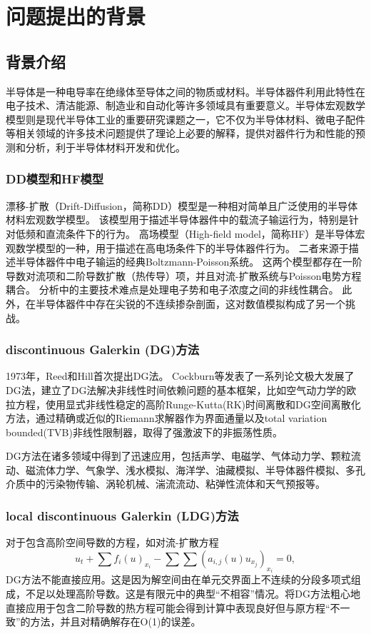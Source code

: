 \section{问题提出的背景}

\subsection{背景介绍}
半导体是一种电导率在绝缘体至导体之间的物质或材料。半导体器件利用此特性在电子技术、清洁能源、制造业和自动化等许多领域具有重要意义。半导体宏观数学模型则是现代半导体工业的重要研究课题之一，它不仅为半导体材料、微电子配件等相关领域的许多技术问题提供了理论上必要的解释，提供对器件行为和性能的预测和分析，利于半导体材料开发和优化。
\subsubsection{DD模型\cite{cercignani2000device}和HF模型\cite{cercignani2000device}}
漂移-扩散（Drift-Diffusion，简称DD）模型是一种相对简单且广泛使用的半导体材料宏观数学模型。
该模型用于描述半导体器件中的载流子输运行为，特别是针对低频和直流条件下的行为。
高场模型（High-field model，简称HF）是半导体宏观数学模型的一种，用于描述在高电场条件下的半导体器件行为。
二者来源于描述半导体器件中电子输运的经典Boltzmann-Poisson系统。
这两个模型都存在一阶导数对流项和二阶导数扩散（热传导）项，并且对流-扩散系统与Poisson电势方程耦合\cite{cercignani2000device}。
分析中的主要技术难点是处理电子势和电子浓度之间的非线性耦合。
此外，在半导体器件中存在尖锐的不连续掺杂剖面，这对数值模拟构成了另一个挑战。
\subsubsection{discontinuous Galerkin (DG)方法}
1973年，Reed和Hill首次提出DG法\cite{reed1973triangular}。
Cockburn等发表了一系列论文极大发展了DG法，建立了DG法解决非线性时间依赖问题的基本框架\cite{reed1973triangular,cockburn1991runge,cockburn1989tvb2,cockburn1989tvb3,cockburn1990runge,cockburn1998runge}，比如空气动力学的欧拉方程，使用显式非线性稳定的高阶Runge-Kutta(RK)时间离散和DG空间离散化方法，通过精确或近似的Riemann求解器作为界面通量以及total variation bounded(TVB)非线性限制器，取得了强激波下的非振荡性质。

DG方法在诸多领域中得到了迅速应用，包括声学、电磁学、气体动力学、颗粒流动、磁流体力学、气象学、浅水模拟、海洋学、油藏模拟、半导体器件模拟、多孔介质中的污染物传输、涡轮机械、湍流流动、粘弹性流体和天气预报等\cite{cockburn2000development}。

\subsubsection{local discontinuous Galerkin (LDG)方法}
对于包含高阶空间导数的方程，如对流-扩散方程
\begin{equation}\label{eq:convection-diffusion}
    u_t + \sum f_i(u)_{x_i} - \sum \sum (a_{i,j}(u)u_{x_j})_{x_i} = 0,
\end{equation}
DG方法不能直接应用。这是因为解空间由在单元交界面上不连续的分段多项式组成，不足以处理高阶导数。这是有限元中的典型“不相容”情况。将DG方法粗心地直接应用于包含二阶导数的热方程可能会得到计算中表现良好但与原方程“不一致”的方法，并且对精确解存在O(1)的误差\cite{cockburn2001runge,zhang2003analysis}。

